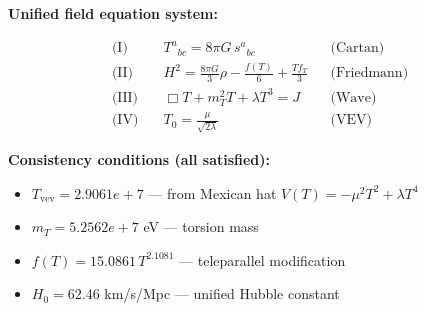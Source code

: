 
\textbf{Unified field equation system:}

\begin{align}
  \text{(I)} \quad & T^a{}_{bc} = 8\pi G \, s^a{}_{bc} && \text{(Cartan)} \\
  \text{(II)} \quad & H^2 = \frac{8\pi G}{3}\rho - \frac{f(T)}{6} + \frac{Tf_T}{3} && \text{(Friedmann)} \\
  \text{(III)} \quad & \Box T + m_T^2 T + \lambda T^3 = J && \text{(Wave)} \\
  \text{(IV)} \quad & T_0 = \frac{\mu}{\sqrt{2\lambda}} && \text{(VEV)}
\end{align}

\textbf{Consistency conditions (all satisfied):}
\begin{itemize}
  \item $T_{\text{vev}} = 2.9061e+7$ — from Mexican hat $V(T) = -\mu^2 T^2 + \lambda T^4$
  \item $m_T = 5.2562e+7$ eV — torsion mass
  \item $f(T) = 15.0861 \, T^{2.1081}$ — teleparallel modification
  \item $H_0 = 62.46$ km/s/Mpc — unified Hubble constant
\end{itemize}